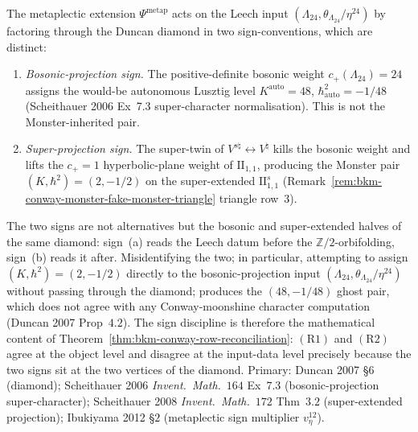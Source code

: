 \begin{remark}
\label{rem:bkm-conway-psi-image-sign-and-diamond}
The metaplectic extension $\Psi^{\mathrm{metap}}$ acts on the
Leech input $(\Lambda_{24},\theta_{\Lambda_{24}}/\eta^{24})$
by factoring through the Duncan diamond in two sign-conventions,
which are distinct:
\begin{enumerate}[label=\textup{(\alph*)}]
\item \emph{Bosonic-projection sign.} The positive-definite
bosonic weight $c_+(\Lambda_{24}) = 24$ assigns the would-be
autonomous Lusztig level
$K^{\mathrm{auto}} = 48$, $\hbar^2_{\mathrm{auto}} = -1/48$
(Scheithauer 2006 Ex~7.3 super-character normalisation).
This is not the Monster-inherited pair.
\item \emph{Super-projection sign.} The super-twin of
$V^{s\natural}\leftrightarrow V^\natural$ kills the
bosonic weight and lifts the $c_+ = 1$ hyperbolic-plane weight
of $\mathrm{II}_{1,1}$, producing the Monster pair
$(K,\hbar^2) = (2,-1/2)$ on the super-extended
$\mathrm{II}_{1,1}^{s}$
(Remark~\ref{rem:bkm-conway-monster-fake-monster-triangle}
triangle row~3).
\end{enumerate}
The two signs are not alternatives but the bosonic and super-extended
halves of the same diamond: sign~(a) reads the Leech datum before
the $\mathbb{Z}/2$-orbifolding, sign~(b) reads it after.
Misidentifying the two; in particular, attempting to assign
$(K,\hbar^2) = (2,-1/2)$ directly to the bosonic-projection input
$(\Lambda_{24},\theta_{\Lambda_{24}}/\eta^{24})$ without passing
through the diamond; produces the $(48,-1/48)$ ghost pair, which
does not agree with any Conway-moonshine character computation
(Duncan 2007 Prop~$4.2$). The sign discipline is therefore the
mathematical content of Theorem~\ref{thm:bkm-conway-row-reconciliation}:
$(\mathrm{R1})$ and $(\mathrm{R2})$ agree at the object level and
disagree at the input-data level precisely because the two signs
sit at the two vertices of the diamond.
Primary:
Duncan 2007 \S 6 (diamond);
Scheithauer 2006 \emph{Invent.~Math.}~$164$ Ex~$7.3$
(bosonic-projection super-character);
Scheithauer 2008 \emph{Invent.~Math.}~$172$ Thm~$3.2$
(super-extended projection);
Ibukiyama 2012 \S$2$ (metaplectic sign multiplier $v_\eta^{12}$).
\end{remark}

